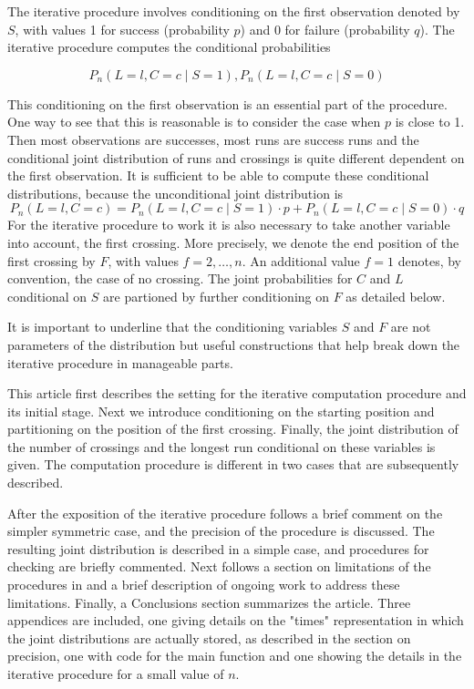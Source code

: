 The iterative procedure involves conditioning on the first observation denoted by $S$, with values 1 for success (probability $p$) and 0 for failure (probability $q$). The iterative procedure computes the conditional probabilities 

$$P_n (L=l,C=c \mid S=1), P_n (L=l,C=c \mid S=0)$$

This conditioning on the first observation is an essential part of the procedure. One way to see that this is reasonable is to consider the case when $p$ is close to 1. Then most observations are successes, most runs are success runs and the conditional joint distribution of runs and crossings is quite different dependent on the first observation. It is sufficient to be able to compute these conditional distributions, because the unconditional joint distribution is $$P_n (L=l,C=c) = P_n (L=l,C=c \mid S=1) \cdot p + P_n (L=l,C=c \mid S=0) \cdot q$$ For the iterative procedure to work it is also necessary to take another variable into account, the first crossing. More precisely, we denote the end position of the first crossing by $F$, with values $f=2, \ldots ,n$. An additional value $f=1$ denotes, by convention, the case of no crossing. The joint probabilities for $C$ and $L$ conditional on $S$ are partioned by further conditioning on $F$ as detailed below.

It is important to underline that the conditioning variables $S$ and $F$ are not parameters of the distribution but useful constructions that help break down the iterative procedure in manageable parts.

This article first describes the setting for the iterative computation procedure and its initial stage. Next we introduce conditioning on the starting position and partitioning on the position of the first crossing. Finally, the joint distribution of the number of crossings and the longest run conditional on these variables is given. The computation procedure is different in two cases that are subsequently described. 

After the exposition of the iterative procedure follows a brief comment on the simpler symmetric case, and the precision of the procedure is discussed. The resulting joint distribution is described in a simple case, and procedures for checking are briefly commented. Next follows a section on limitations of the procedures in  and a brief description of ongoing work to address these limitations. Finally, a Conclusions section summarizes the article. Three appendices are included, one giving details on the "times" representation in which the joint distributions are actually stored, as described in the section on precision, one with code for the main function  and one showing the details in the iterative procedure for a small value of $n$. 

